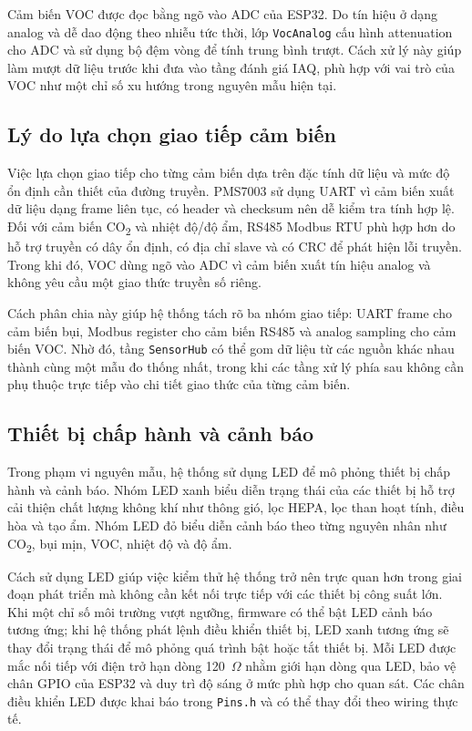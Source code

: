 Cảm biến VOC được đọc bằng ngõ vào ADC của ESP32. Do tín hiệu ở dạng analog và dễ dao
động theo nhiễu tức thời, lớp \texttt{VocAnalog} cấu hình attenuation cho ADC và sử
dụng bộ đệm vòng để tính trung bình trượt. Cách xử lý này giúp làm mượt dữ liệu trước
khi đưa vào tầng đánh giá IAQ, phù hợp với vai trò của VOC như một chỉ số xu hướng trong
nguyên mẫu hiện tại.

\subsection{Lý do lựa chọn giao tiếp cảm biến}

Việc lựa chọn giao tiếp cho từng cảm biến dựa trên đặc tính dữ liệu và mức độ ổn định
cần thiết của đường truyền. PMS7003 sử dụng UART vì cảm biến xuất dữ liệu dạng frame
liên tục, có header và checksum nên dễ kiểm tra tính hợp lệ. Đối với cảm biến
CO\textsubscript{2} và nhiệt độ/độ ẩm, RS485 Modbus RTU phù hợp hơn do hỗ trợ truyền
có dây ổn định, có địa chỉ slave và có CRC để phát hiện lỗi truyền. Trong khi đó, VOC
dùng ngõ vào ADC vì cảm biến xuất tín hiệu analog và không yêu cầu một giao thức truyền
số riêng.

Cách phân chia này giúp hệ thống tách rõ ba nhóm giao tiếp: UART frame cho cảm biến bụi,
Modbus register cho cảm biến RS485 và analog sampling cho cảm biến VOC. Nhờ đó, tầng
\texttt{SensorHub} có thể gom dữ liệu từ các nguồn khác nhau thành cùng một mẫu đo thống
nhất, trong khi các tầng xử lý phía sau không cần phụ thuộc trực tiếp vào chi tiết giao
thức của từng cảm biến.

\subsection{Thiết bị chấp hành và cảnh báo}

Trong phạm vi nguyên mẫu, hệ thống sử dụng LED để mô phỏng thiết bị chấp hành và cảnh
báo. Nhóm LED xanh biểu diễn trạng thái của các thiết bị hỗ trợ cải thiện chất lượng
không khí như thông gió, lọc HEPA, lọc than hoạt tính, điều hòa và tạo ẩm. Nhóm LED đỏ
biểu diễn cảnh báo theo từng nguyên nhân như CO\textsubscript{2}, bụi mịn, VOC, nhiệt
độ và độ ẩm.

Cách sử dụng LED giúp việc kiểm thử hệ thống trở nên trực quan hơn trong giai đoạn phát
triển mà không cần kết nối trực tiếp với các thiết bị công suất lớn. Khi một chỉ số môi
trường vượt ngưỡng, firmware có thể bật LED cảnh báo tương ứng; khi hệ thống phát lệnh
điều khiển thiết bị, LED xanh tương ứng sẽ thay đổi trạng thái để mô phỏng quá trình
bật hoặc tắt thiết bị. Mỗi LED được mắc nối tiếp với điện trở hạn dòng 120~$\Omega$ nhằm
giới hạn dòng qua LED, bảo vệ chân GPIO của ESP32 và duy trì độ sáng ở mức phù hợp cho
quan sát. Các chân điều khiển LED được khai báo trong \texttt{Pins.h} và có thể thay đổi
theo wiring thực tế.
